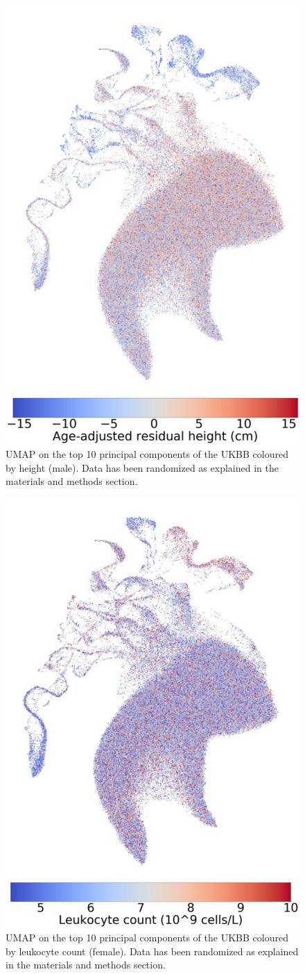 \documentclass[12pt]{pnas-new}
\begin{document}
\begin{figure}
    \centering
    \includegraphics[width=0.4\columnwidth]{images/UKBB_UMAP_PC10_NN15_MD05_2018328174511_2018714161841_Height_res_pct1_m.pdf}
    \caption{UMAP on the top 10 principal components of the UKBB coloured by height (male). Data has been randomized as explained in the materials and methods section.}
    \label{fig:supp_ukbb_height_m}
\end{figure}

\begin{figure}
    \centering
    \includegraphics[width=0.4\columnwidth]{images/UKBB_UMAP_PC10_NN15_MD05_2018328174511_201871416519_leukocyte_count_pct5_f.pdf}
    \caption{UMAP on the top 10 principal components of the UKBB coloured by leukocyte count (female). Data has been randomized as explained in the materials and methods section.}
    \label{fig:supp_ukbb_leukocyte_f}
\end{figure}
\end{document}
